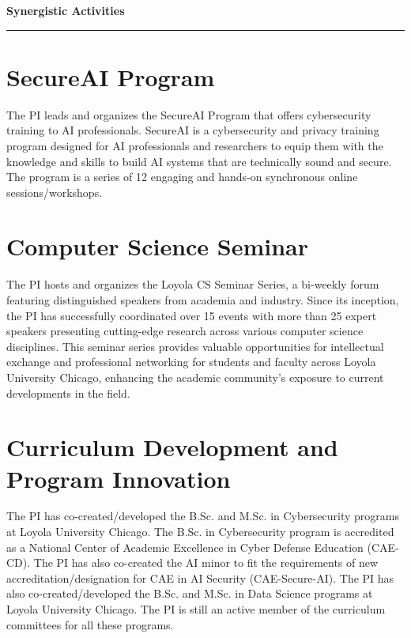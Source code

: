 \setcounter{section}{0}

{\Large\bfseries\filcenter
Synergistic Activities
\\\rule{\textwidth}{0.4pt}}


\section{SecureAI Program}

The PI leads and organizes the SecureAI Program that offers cybersecurity training to AI professionals.  SecureAI is a cybersecurity and privacy training program designed for AI professionals and researchers to equip them with the knowledge and skills to build AI systems that are technically sound and secure. The program is a series of 12 engaging and hands-on synchronous online sessions/workshops.



\section{Computer Science Seminar} 
The PI hosts and organizes the Loyola CS Seminar Series, a bi-weekly forum featuring distinguished speakers from academia and industry. Since its inception, the PI has successfully coordinated over 15 events with more than 25 expert speakers presenting cutting-edge research across various computer science disciplines. This seminar series provides valuable opportunities for intellectual exchange and professional networking for students and faculty across Loyola University Chicago, enhancing the academic community's exposure to current developments in the field.

\section{Curriculum Development and Program Innovation} 
The PI has co-created/developed the B.Sc. and M.Sc. in Cybersecurity programs at Loyola University Chicago. The B.Sc. in Cybersecurity program is accredited as a National Center of Academic Excellence in Cyber Defense Education (CAE-CD). The PI has also co-created the AI minor to fit the requirements of new accreditation/designation for CAE in AI Security (CAE-Secure-AI).
The PI has also co-created/developed the B.Sc. and M.Sc. in Data Science programs at Loyola University Chicago. 
The PI is still an active member of the curriculum committees for all these programs.



